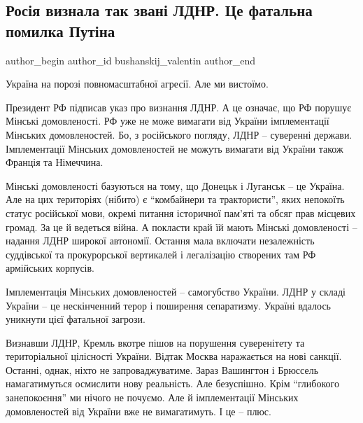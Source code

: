  
 
 
 
 
 
\subsection{Росія визнала так звані ЛДНР. Це фатальна помилка Путіна}
\label{sec:22_02_2022.stz.news.ua.gazeta.1.pomylka_putin}
 
\ifcmt
 author_begin
   author_id bushanskij_valentin
 author_end
\fi

Україна на порозі повномасштабної агресії. Але ми вистоїмо.

Президент РФ підписав указ про визнання ЛДНР. А це означає, що РФ порушує
Мінські домовленості. РФ уже не може вимагати від України імплементації
Мінських домовленостей. Бо, з російського погляду, ЛДНР – суверенні держави.
Імплементації Мінських домовленостей не можуть вимагати від України також
Франція та Німеччина.

Мінські домовленості базуються на тому, що Донецьк і Луганськ – це Україна. Але
на цих територіях (нібито) є \enquote{комбайнери та трактористи}, яких непокоїть статус
російської мови, окремі питання історичної пам'яті та обсяг прав місцевих
громад. За це й ведеться війна. А покласти край їй мають Мінські домовленості –
надання ЛДНР широкої автономії. Остання мала включати незалежність суддівської
та прокурорської вертикалей і легалізацію створених там РФ армійських корпусів.

Імплементація Мінських домовленостей – самогубство України. ЛДНР у складі
України – це нескінченний терор і поширення сепаратизму. Україні вдалось
уникнути цієї фатальної загрози.

Визнавши ЛДНР, Кремль вкотре пішов на порушення суверенітету та територіальної
цілісності України. Відтак Москва наражається на нові санкції. Останні, однак,
ніхто не запроваджуватиме. Зараз Вашингтон і Брюссель намагатимуться осмислити
нову реальність. Але безуспішно. Крім \enquote{глибокого занепокоєння} ми
нічого не почуємо. Але й імплементації Мінських домовленостей від України вже
не вимагатимуть. І це – плюс.

